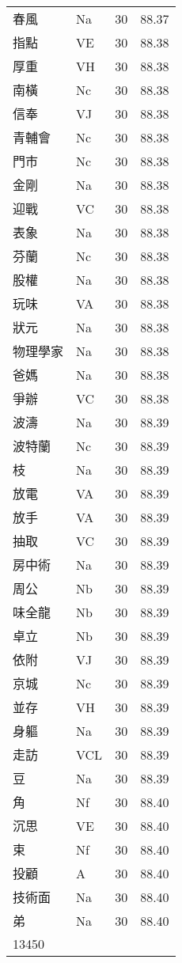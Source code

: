 \documentclass[twocolumn]{book}
\begin{document}
\begin{supertabular}{llrr}
春風 & Na & 30 &  88.37\\
指點 & VE & 30 &  88.38\\
厚重 & VH & 30 &  88.38\\
南橫 & Nc & 30 &  88.38\\
信奉 & VJ & 30 &  88.38\\
青輔會 & Nc & 30 &  88.38\\
門市 & Nc & 30 &  88.38\\
金剛 & Na & 30 &  88.38\\
迎戰 & VC & 30 &  88.38\\
表象 & Na & 30 &  88.38\\
芬蘭 & Nc & 30 &  88.38\\
股權 & Na & 30 &  88.38\\
玩味 & VA & 30 &  88.38\\
狀元 & Na & 30 &  88.38\\
物理學家 & Na & 30 &  88.38\\
爸媽 & Na & 30 &  88.38\\
爭辦 & VC & 30 &  88.38\\
波濤 & Na & 30 &  88.39\\
波特蘭 & Nc & 30 &  88.39\\
枝 & Na & 30 &  88.39\\
放電 & VA & 30 &  88.39\\
放手 & VA & 30 &  88.39\\
抽取 & VC & 30 &  88.39\\
房中術 & Na & 30 &  88.39\\
周公 & Nb & 30 &  88.39\\
味全龍 & Nb & 30 &  88.39\\
卓立 & Nb & 30 &  88.39\\
依附 & VJ & 30 &  88.39\\
京城 & Nc & 30 &  88.39\\
並存 & VH & 30 &  88.39\\
身軀 & Na & 30 &  88.39\\
走訪 & VCL & 30 &  88.39\\
豆 & Na & 30 &  88.39\\
角 & Nf & 30 &  88.40\\
沉思 & VE & 30 &  88.40\\
束 & Nf & 30 &  88.40\\
投顧 & A & 30 &  88.40\\
技術面 & Na & 30 &  88.40\\
弟 & Na & 30 &  88.40\\
13450\\

\end{supertabular}
\end{document}
